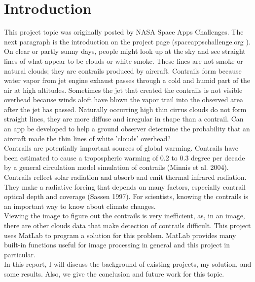 \chapter{Introduction}

This project topic was originally posted by NASA Space Apps Challenges. The next paragraph is the introduction on the project page (spaceappschallenge.org ).\\
On clear or partly sunny days, people might look up at the sky and see straight lines of what appear to be clouds or white smoke. These lines are not smoke or natural clouds; they are contrails produced by aircraft. Contrails form because water vapor from jet engine exhaust passes through a cold and humid part of the air at high altitudes. Sometimes the jet that created the contrails is not visible overhead because winds aloft have blown the vapor trail into the observed area after the jet has passed. Naturally occurring high thin cirrus clouds do not form straight lines, they are more diffuse and irregular in shape than a contrail. Can an app be developed to help a ground observer determine the probability that an aircraft made the thin lines of white 'clouds' overhead?\\
Contrails are potentially important sources of global warming. Contrails have been estimated to cause a tropospheric warming of 0.2 to 0.3 degree per decade by a general circulation model simulation of contrails (Minnis et al. 2004). Contrails reflect solar radiation and absorb and emit thermal infrared radiation. They make a radiative forcing that depends on many factors, especially contrail optical depth and coverage (Sassen 1997). For scientists, knowing the contrails is an important way to know about climate changes. \\
Viewing the image to figure out the contrails is very inefficient, as, in an image, there are other clouds data that make detection of contrails difficult. This project uses MatLab to program a solution for this problem. MatLab provides many built-in functions useful for image processing in general and this project in particular. \\
In this report, I will discuss the background of existing projects, my solution, and some results. Also, we give the conclusion and future work for this topic.